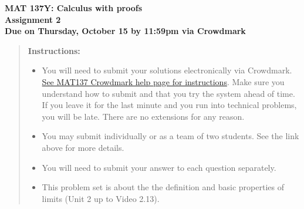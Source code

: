 \documentclass[12pt]{exam}
\newcommand{\vv}{\vspace{.2cm}}
\begin{document}
{\large
	\begin{center}
		{\bf MAT 137Y: Calculus with proofs}\\
		{\bf Assignment 2} \\
		{\bf Due on Thursday, October 15 by 11:59pm via Crowdmark}
	\end{center}
}

\vv

\begin{quotation}
{\bf Instructions:}
	\begin{itemize}
		\item	 You will need to submit your solutions electronically via Crowdmark.   \href{https://www.math.toronto.edu/~alfonso/137/PS/137_CM.html}{See MAT137 Crowdmark help page for instructions}.  Make sure you understand how to submit and that you try the system ahead of time.  If you leave it for the last minute and you run into technical problems, you will be late.  There are no extensions for any reason.
		\item You may submit individually or as a team of two students.  See the link above for more details.
		\item  You will need to submit your answer to each question separately.
		\item  This problem set is about the the definition and basic properties of limits (Unit 2 up to Video 2.13).
	\end{itemize}
\end{quotation}
\vv
\end{document}
